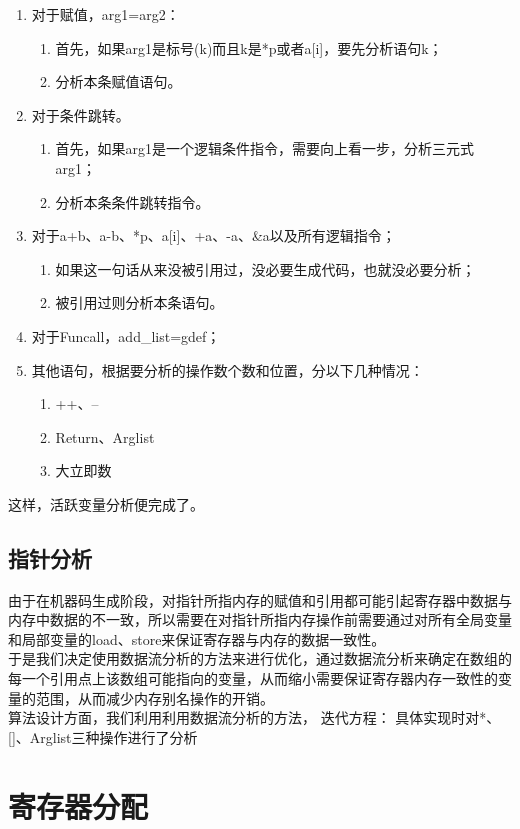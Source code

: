 \documentclass[12pt,a4paper,Flow]{report}
\begin{document}
\begin{enumerate}
\item 对于赋值，arg1=arg2：
\begin{enumerate}
\item 首先，如果arg1是标号(k)而且k是*p或者a[i]，要先分析语句k；
\item 分析本条赋值语句。
\end{enumerate}
\item 对于条件跳转。
\begin{enumerate}
\item 首先，如果arg1是一个逻辑条件指令，需要向上看一步，分析三元式arg1；
\item 分析本条条件跳转指令。
\end{enumerate}
\item 对于a+b、a-b、*p、a[i]、+a、-a、\&a以及所有逻辑指令；
\begin{enumerate}
\item 如果这一句话从来没被引用过，没必要生成代码，也就没必要分析；
\item 被引用过则分析本条语句。
\end{enumerate}
\item 对于Funcall，add\_list=gdef；
\item 其他语句，根据要分析的操作数个数和位置，分以下几种情况：
\begin{enumerate}
\item ++、--
\item Return、Arglist
\item 大立即数
\end{enumerate}
\end{enumerate}
这样，活跃变量分析便完成了。\\
\subsection{指针分析}
由于在机器码生成阶段，对指针所指内存的赋值和引用都可能引起寄存器中数据与内存中数据的不一致，所以需要在对指针所指内存操作前需要通过对所有全局变量和局部变量的load、store来保证寄存器与内存的数据一致性。\\
\indent 于是我们决定使用数据流分析的方法来进行优化，通过数据流分析来确定在数组的每一个引用点上该数组可能指向的变量，从而缩小需要保证寄存器内存一致性的变量的范围，从而减少内存别名操作的开销。\\
\indent 算法设计方面，我们利用利用数据流分析的方法，
	迭代方程：
具体实现时对*、[]、Arglist三种操作进行了分析
\section{寄存器分配}
\end{document}
